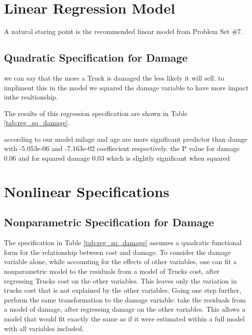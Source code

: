 \documentclass[11pt]{paper}
\begin{document}
\section{Linear Regression Model}

A natural staring point is the recommended linear model
from Problem Set \#7. 

\subsection{Quadratic Specification for Damage}

we can say that the more a Truck is damaged the less likely it will sell. 
to impliment this in the model we squared the damage variable to have more impact inthe realtionship.


The results of this regression specification are shown in 
Table \ref{tab:reg_sq_damage}. 
% 

% 
according to our model milage and age are more significant predictor than damge with -5.053e-06 and -7.163e-02 coeffiecient respectively. 
the P value for damage 0.06 and for squared damage 0.03 which is slightly significant when squared







\clearpage
\section{Nonlinear Specifications}


\subsection{Nonparametric Specification for Damage}


The specification in 
Table \ref{tab:reg_sq_damage}
assumes a quadratic functional form for
the relationship between cost and damage. 
To consider the damage variable alone, 
while accounting for the effects of other variables, 
one can fit a nonparametric model to the residuals 
from a model of Trucks cost, 
after regressing Trucks cost on the other variables. 
This leaves only the variation in trucks cost that is not explained by the other variables. 
Going one step further, perform the same transformation to the damage variable:
take the residuals from a model of damage, 
after regressing damage on the other variables. 
This allows a model that would fit exactly the same as if it were estimated within a full model with all variables included. 
\end{document}
